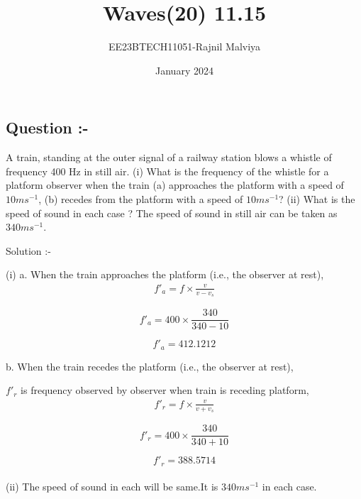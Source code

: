 \documentclass[journal,12pt,twocolumn]{IEEEtran}
\theoremstyle{remark}
\begin{document}
\title{Waves(20) 11.15}
\author{EE23BTECH11051-Rajnil Malviya}
\date{January 2024}



\maketitle

\subsection*{\textbf{Question :-}}
A train, standing at the outer signal of a railway station blows a whistle of frequency
400 Hz in still air. (i) What is the frequency of the whistle for a platform observer
when the train (a) approaches the platform with a speed of $10 ms^{-1} $, (b) recedes
from the platform with a speed of $10 ms^{-1} $? (ii) What is the speed of sound in each
case ? The speed of sound in still air can be taken as $340 ms^{-1} $.

\bigskip
Solution :-\\
         \begin{table}[h]
        
    \end{table}

(i)  a. When the train approaches the platform (i.e., the observer at rest),
\bigskip
\begin{align}f'_a=f\times\frac{v}{v-v_s}\end{align}

$$f'_a=400\times\frac{340}{340-10}$$

$$f'_a=412.1212$$
\bigskip

b. When the train recedes the platform (i.e., the observer at rest),
\bigskip

$f'_r $ is frequency observed by observer when train is receding platform,\\
\begin{align}f'_r=f\times\frac{v}{v+v_s}\end{align}

$$f'_r=400\times\frac{340}{340+10}$$

$$f'_r=388.5714$$\\
(ii) The speed of sound in each will be same.It is $340  ms^{-1}$ in each case.
\end{document}
